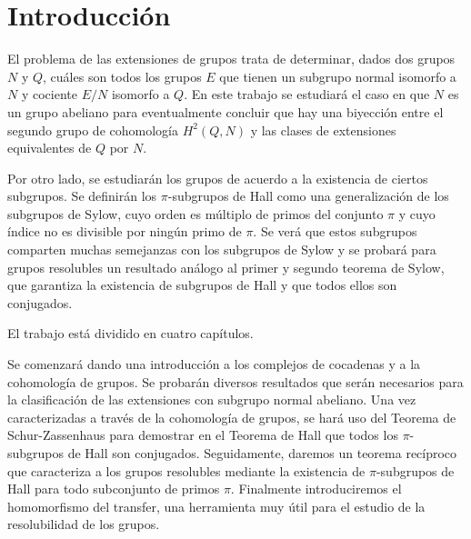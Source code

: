 
\chapter{Introducción}

El problema de las extensiones de grupos trata de determinar, dados dos grupos $N$ y $Q$, cuáles son todos los grupos $E$ que tienen un subgrupo normal isomorfo a $N$ y cociente $E/N$ isomorfo a $Q$. En este trabajo se estudiará el caso en que $N$ es un grupo abeliano para eventualmente concluir que hay una biyección entre el segundo grupo de cohomología $H^2(Q,N)$ y las clases de extensiones equivalentes de $Q$ por $N$.

Por otro lado, se estudiarán los grupos de acuerdo a la existencia de ciertos subgrupos. Se definirán los $\pi$-subgrupos de Hall como una generalización de los subgrupos de Sylow, cuyo orden es múltiplo de primos del conjunto $\pi$ y cuyo índice no es divisible por ningún primo de $\pi$. Se verá que estos subgrupos comparten muchas semejanzas con los subgrupos de Sylow y se probará para grupos resolubles un resultado análogo al primer y segundo teorema de Sylow, que garantiza la existencia de subgrupos de Hall y que todos ellos son conjugados.

El trabajo está dividido en cuatro capítulos.

Se comenzará dando una introducción a los complejos de cocadenas y a la cohomología de grupos. Se probarán diversos resultados que serán necesarios para la clasificación de las extensiones con subgrupo normal abeliano. Una vez caracterizadas a través de la cohomología de grupos, se hará uso del Teorema de Schur-Zassenhaus para demostrar en el Teorema de Hall que todos los $\pi$-subgrupos de Hall son conjugados. Seguidamente, daremos un teorema recíproco que caracteriza a los grupos resolubles mediante la existencia de $\pi$-subgrupos de Hall para todo subconjunto de primos $\pi$. Finalmente introduciremos el homomorfismo del transfer, una herramienta muy útil para el estudio de la resolubilidad de los grupos.